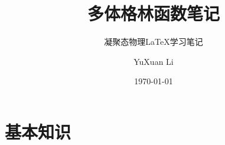 \documentclass[cn]{elegantbook}
\title{多体格林函数笔记}
\subtitle{凝聚态物理\LaTeX{}学习笔记}
\author{YuXuan Li}
\institute{名字没想好}
\date{\today}
\begin{document}
\maketitle
\tableofcontents
\clearpage
\thispagestyle{empty}

\mainmatter
\hypersetup{pageanchor=true}

\chapter{基本知识}



\nocite{EINAV2010,Havrylchyk2018} 



\appendix
\end{document}
